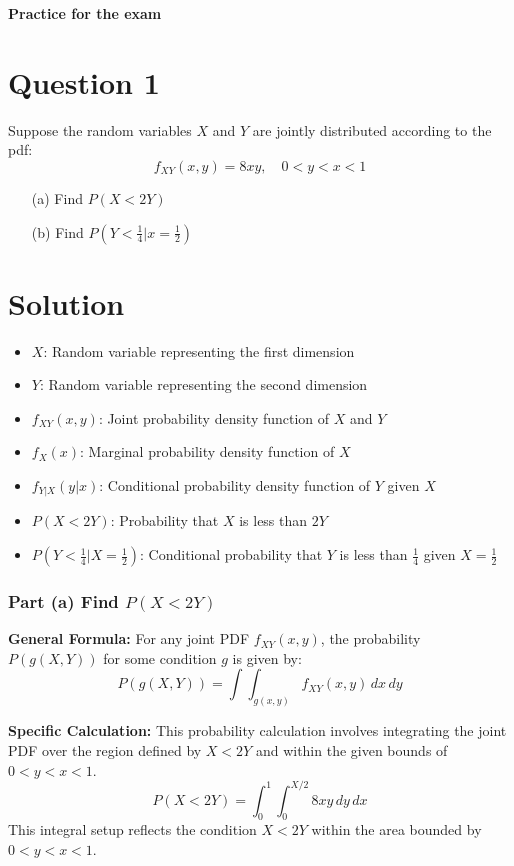 \documentclass[12pt]{article}
\begin{document}
\begin{center}
  \Large \textbf{Practice for the exam}
\end{center}

\section*{Question 1}
Suppose the random variables \(X\) and \(Y\) are jointly distributed according to the pdf:
\[ f_{XY}(x,y) = 8xy, \quad 0 < y < x < 1 \]
\begin{itemize}
  \item[(a)] Find \( P(X < 2Y) \)
  \item[(b)] Find \( P(Y < \frac{1}{4} |  x = \frac{1}{2}) \)
\end{itemize}


\section*{Solution}
\begin{itemize}
  \item \( X \): Random variable representing the first dimension
  \item \( Y \): Random variable representing the second dimension
  \item \( f_{XY}(x, y) \): Joint probability density function of \( X \) and \( Y \)
  \item \( f_X(x) \): Marginal probability density function of \( X \)
  \item \( f_{Y|X}(y|x) \): Conditional probability density function of \( Y \) given \( X \)
  \item \( P(X < 2Y) \): Probability that \( X \) is less than \( 2Y \)
  \item \( P(Y < \frac{1}{4} | X = \frac{1}{2}) \): Conditional probability that \( Y \) is less than \( \frac{1}{4} \) given \( X = \frac{1}{2} \)
\end{itemize}
\subsubsection*{Part (a) Find \( P(X < 2Y) \)}
\textbf{General Formula:}
For any joint PDF \( f_{XY}(x, y) \), the probability \( P(g(X, Y)) \) for some condition \( g \) is given by:
\[ P(g(X, Y)) = \int \int_{g(x, y)} f_{XY}(x, y) \, dx \, dy \]

\textbf{Specific Calculation:}
This probability calculation involves integrating the joint PDF over the region defined by \( X < 2Y \) and within the given bounds of \( 0 < y < x < 1 \).
\[
  P(X < 2Y) = \int_0^1 \int_0^{X/2} 8xy \, dy \, dx
\]
This integral setup reflects the condition \( X < 2Y \) within the area bounded by \( 0 < y < x < 1 \).
\end{document}
